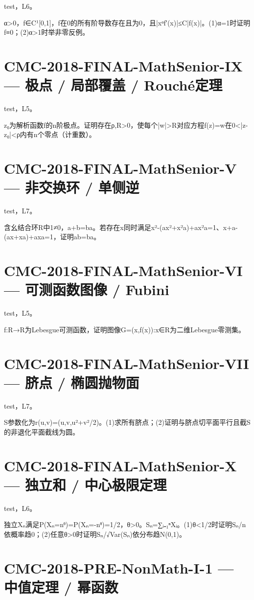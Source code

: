 \documentclass[UTF8]{ctexart}
\begin{document}
test，L6。

α>0，f∈C¹[0,1]，f在0的所有阶导数存在且为0，且|xᵅf′(x)|≤C|f(x)|。(1)α=1时证明f≡0；(2)α>1时举非零反例。

\section*{CMC-2018-FINAL-MathSenior-IX — 极点 / 局部覆盖 / Rouché定理}

test，L5。

z₀为解析函数f的n阶极点。证明存在ρ,R>0，使每个|w|>R对应方程f(z)=w在0<|z-z₀|<ρ内有n个零点（计重数）。

\section*{CMC-2018-FINAL-MathSenior-V — 非交换环 / 单侧逆}

test，L7。

含幺结合环R中1≠0，a+b=ba。若存在x同时满足x²-(ax²+x²a)+ax²a=1、x+a-(ax+xa)+axa=1，证明ab=ba。

\section*{CMC-2018-FINAL-MathSenior-VI — 可测函数图像 / Fubini}

test，L5。

f:R→R为Lebesgue可测函数，证明图像G={(x,f(x)):x∈R}为二维Lebesgue零测集。

\section*{CMC-2018-FINAL-MathSenior-VII — 脐点 / 椭圆抛物面}

test，L7。

S参数化为r(u,v)=(u,v,u²+v²/2)。(1)求所有脐点；(2)证明与脐点切平面平行且截S的非退化平面截线为圆。

\section*{CMC-2018-FINAL-MathSenior-X — 独立和 / 中心极限定理}

test，L6。

独立Xₙ满足P(Xₙ=nᶿ)=P(Xₙ=-nᶿ)=1/2，θ>0。Sₙ=∑ᵢ₌₁ⁿXᵢ。(1)θ<1/2时证明Sₙ/n依概率趋0；(2)任意θ>0时证明Sₙ/√Var(Sₙ)依分布趋N(0,1)。

\section*{CMC-2018-PRE-NonMath-I-1 — 中值定理 / 幂函数}
\end{document}
